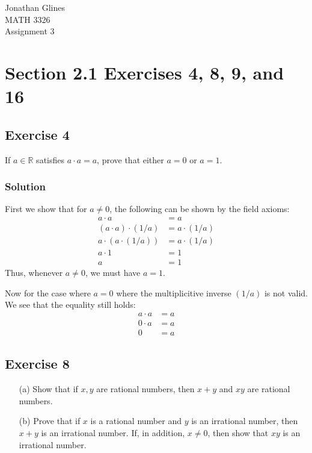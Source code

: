 \documentclass[12pt]{article}
\begin{document}
\begin{flushright}
{\Large
Jonathan Glines \\
MATH 3326 \\
Assignment 3 \\
}
\end{flushright}
\section*{Section 2.1 Exercises 4, 8, 9, and 16}
\subsection*{Exercise 4}
If $a \in \mathbb{R}$ satisfies $a \cdot a = a$, prove that either $a = 0$ or $a = 1$.
\subsubsection*{Solution}
First we show that for $a \neq 0$, the following can be shown by the field axioms:
\begin{align*}
a \cdot a &= a \\
\left(a \cdot a\right) \cdot \left(1/a\right) &= a \cdot \left(1 / a\right) \\
a \cdot \left(a \cdot \left(1/a\right)\right) &= a \cdot \left(1/a\right) \\
a \cdot 1 &= 1 \\
a &= 1
\end{align*}
Thus, whenever $a \neq 0$, we must have $a = 1$.

Now for the case where $a = 0$ where the multiplicitive inverse $\left(1/a\right)$ is not valid. We see that the equality still holds:
\begin{align*}
a \cdot a &= a \\
0 \cdot a &= a \\
0 &= a
\end{align*}

\subsection*{Exercise 8}
\begin{itemize}
\item[(a)] Show that if $x, y$ are rational numbers, then $x + y$ and $xy$ are rational numbers.
\item[(b)] Prove that if $x$ is a rational number and $y$ is an irrational number, then $x + y$ is an irrational number. If, in addition, $x \neq 0$, then show that $xy$ is an irrational number.
\end{itemize}
\end{document}
